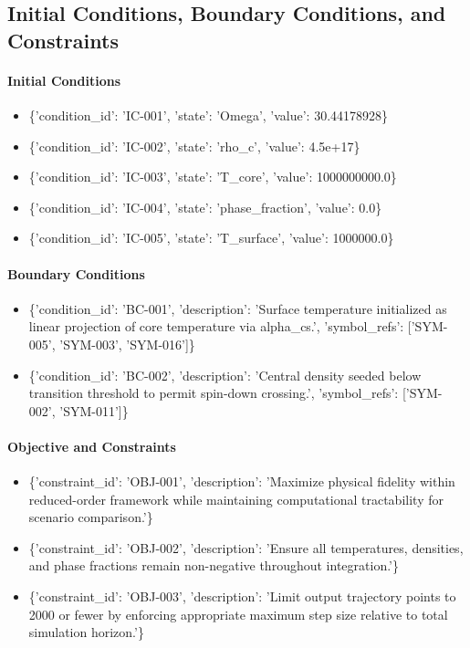 \documentclass[11pt]{article}
\begin{document}
\subsection{Initial Conditions, Boundary Conditions, and Constraints}

\paragraph{Initial Conditions}
\begin{itemize}\raggedright
\item \{'condition\_\allowbreak{}id': 'IC-001', 'state': 'Omega', 'value': 30.44178928\}
\item \{'condition\_\allowbreak{}id': 'IC-002', 'state': 'rho\_\allowbreak{}c', 'value': 4.5e+17\}
\item \{'condition\_\allowbreak{}id': 'IC-003', 'state': 'T\_\allowbreak{}core', 'value': 1000000000.0\}
\item \{'condition\_\allowbreak{}id': 'IC-004', 'state': 'phase\_\allowbreak{}fraction', 'value': 0.0\}
\item \{'condition\_\allowbreak{}id': 'IC-005', 'state': 'T\_\allowbreak{}surface', 'value': 1000000.0\}
\end{itemize}

\paragraph{Boundary Conditions}
\begin{itemize}\raggedright
\item \{'condition\_\allowbreak{}id': 'BC-001', 'description': 'Surface temperature initialized as linear projection of core temperature via alpha\_\allowbreak{}cs.', 'symbol\_\allowbreak{}refs': ['SYM-005', 'SYM-003', 'SYM-016']\}
\item \{'condition\_\allowbreak{}id': 'BC-002', 'description': 'Central density seeded below transition threshold to permit spin-down crossing.', 'symbol\_\allowbreak{}refs': ['SYM-002', 'SYM-011']\}
\end{itemize}

\paragraph{Objective and Constraints}
\begin{itemize}\raggedright
\item \{'constraint\_\allowbreak{}id': 'OBJ-001', 'description': 'Maximize physical fidelity within reduced-order framework while maintaining computational tractability for scenario comparison.'\}
\item \{'constraint\_\allowbreak{}id': 'OBJ-002', 'description': 'Ensure all temperatures, densities, and phase fractions remain non-negative throughout integration.'\}
\item \{'constraint\_\allowbreak{}id': 'OBJ-003', 'description': 'Limit output trajectory points to 2000 or fewer by enforcing appropriate maximum step size relative to total simulation horizon.'\}
\end{itemize}
\end{document}
